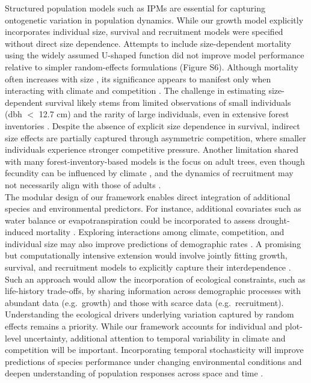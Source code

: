 Structured population models such as IPMs are essential for capturing
ontogenetic variation in population dynamics. While our growth model
explicitly incorporates individual size, survival and recruitment models
were specified without direct size dependence. Attempts to include
size-dependent mortality using the widely assumed U-shaped function
\citep{Lines2010} did not improve model performance relative to simpler
random-effects formulations (Figure S6). Although mortality often
increases with size \citep{Luo2011, Hember2017}, its significance
appears to manifest only when interacting with climate and competition
\citep{LeSquin2021}. The challenge in estimating size-dependent survival
likely stems from limited observations of small individuals (dbh \(<\)
12.7 cm) and the rarity of large individuals, even in extensive forest
inventories \citep{Canham2017}. Despite the absence of explicit size
dependence in survival, indirect size effects are partially captured
through asymmetric competition, where smaller individuals experience
stronger competitive pressure. Another limitation shared with many
forest-inventory-based models
\citep{Kunstler2021, LeSquin2021, Guyennon2023} is the focus on adult
trees, even though fecundity can be influenced by climate
\citep{Clark2021}, and the dynamics of recruitment may not necessarily
align with those of adults
\citetext{\citealp{SerraDiaz2016}; \citealp{Wason2017}; \citealp[but
see][]{Canham2016}}.\\

The modular design of our framework enables direct integration of
additional species and environmental predictors. For instance,
additional covariates such as water balance or evapotranspiration could
be incorporated to assess drought-induced mortality \citep{Peng2011}.
Exploring interactions among climate, competition, and individual size
may also improve predictions of demographic rates
\citep{Peng2011, Ford2017, Rollinson2016, LeSquin2021}. A promising but
computationally intensive extension would involve jointly fitting
growth, survival, and recruitment models to explicitly capture their
interdependence \citep{pang2024niche}. Such an approach would allow the
incorporation of ecological constraints, such as life-history
trade-offs, by sharing information across demographic processes with
abundant data (e.g.~growth) and those with scarce data
(e.g.~recruitment). Understanding the ecological drivers underlying
variation captured by random effects remains a priority. While our
framework accounts for individual and plot-level uncertainty, additional
attention to temporal variability in climate and competition will be
important. Incorporating temporal stochasticity will improve predictions
of species performance under changing environmental conditions and
deepen understanding of population responses across space and time
\citep{Holt2022}.\\

